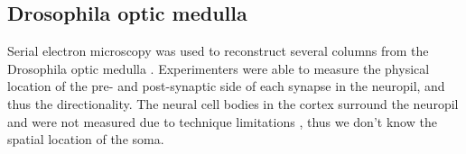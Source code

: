 \documentclass{article}
\begin{document}


\subsection{Drosophila optic medulla}
Serial electron microscopy was used to reconstruct several columns from the Drosophila optic medulla \autocite{Takemura2013}. Experimenters were able to measure the physical location of the pre- and post-synaptic side of each synapse in the neuropil, and thus the directionality. The neural cell bodies in the cortex surround the neuropil and were not measured due to technique limitations \autocite{MeinertzhagenPersonalComm}, thus we don't know the spatial location of the soma. 
\end{document}
